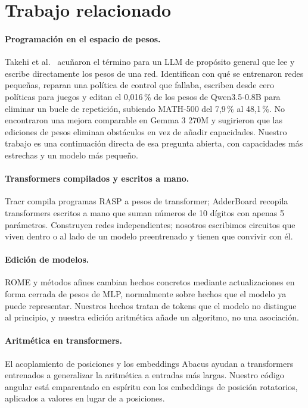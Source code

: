 \documentclass[11pt]{article}
\begin{document}
\section{Trabajo relacionado}
\paragraph{Programación en el espacio de pesos.} Takehi et al.\ \cite{takehi2026} acuñaron el término para un LLM de propósito general que lee y escribe directamente los pesos de una red. Identifican con qué se entrenaron redes pequeñas, reparan una política de control que fallaba, escriben desde cero políticas para juegos y editan el 0,016\,\% de los pesos de Qwen3.5-0.8B para eliminar un bucle de repetición, subiendo MATH-500 del 7,9\,\% al 48,1\,\%. No encontraron una mejora comparable en Gemma 3 270M y sugirieron que las ediciones de pesos eliminan obstáculos en vez de añadir capacidades. Nuestro trabajo es una continuación directa de esa pregunta abierta, con capacidades más estrechas y un modelo más pequeño.

\paragraph{Transformers compilados y escritos a mano.} Tracr \cite{tracr} compila programas RASP \cite{rasp} a pesos de transformer; AdderBoard \cite{adderboard} recopila transformers escritos a mano que suman números de 10 dígitos con apenas 5 parámetros. Construyen redes independientes; nosotros escribimos circuitos que viven dentro o al lado de un modelo preentrenado y tienen que convivir con él.

\paragraph{Edición de modelos.} ROME \cite{rome} y métodos afines cambian hechos concretos mediante actualizaciones en forma cerrada de pesos de MLP, normalmente sobre hechos que el modelo ya puede representar. Nuestros hechos tratan de tokens que el modelo no distingue al principio, y nuestra edición aritmética añade un algoritmo, no una asociación.

\paragraph{Aritmética en transformers.} El acoplamiento de posiciones \cite{cho2024} y los embeddings Abacus \cite{mcleish2024} ayudan a transformers entrenados a generalizar la aritmética a entradas más largas. Nuestro código angular está emparentado en espíritu con los embeddings de posición rotatorios, aplicados a valores en lugar de a posiciones.
\end{document}
